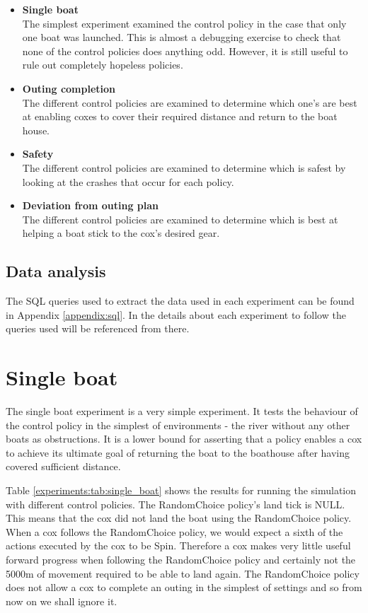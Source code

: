   \begin{itemize}
    \item{\textbf{Single boat}}\\
    The simplest experiment examined the control policy in the case
    that only one boat was launched. This is almost a debugging
    exercise to check that none of the control policies does anything
    odd. However, it is still useful to rule out completely hopeless policies.
  
    \item{\textbf{Outing completion}}\\
    The different control policies are examined to determine which
    one's are best at enabling coxes to cover their required distance
    and return to the boat house.
    
    \item{\textbf{Safety}}\\
    The different control policies are examined to determine which is
    safest by looking at the crashes that occur for each policy.

    \item{\textbf{Deviation from outing plan}}\\
    The different control policies are examined to determine which is
    best at helping a boat stick to the cox's desired gear.
  \end{itemize}

  \subsection{Data analysis}
  The SQL queries used to extract the data used in each experiment can be found in Appendix \ref{appendix:sql}. In the details about each experiment to follow the queries used will be referenced from there.

\section{Single boat}
  The single boat experiment is a very simple experiment. It tests the behaviour of the control policy in the simplest of environments - the river without any other boats as obstructions. It is a lower bound for asserting that a policy enables a cox to achieve its ultimate goal of returning the boat to the boathouse after having covered sufficient distance.
  
  Table \ref{experiments:tab:single_boat} shows the results for running the simulation with different control policies. The RandomChoice policy's land tick is NULL. This means that the cox did not land the boat using the RandomChoice policy. When a cox follows the RandomChoice policy, we would expect a sixth of the actions executed by the cox to be Spin. Therefore a cox makes very little useful forward progress when following the RandomChoice policy and certainly not the 5000m of movement required to be able to land again. The RandomChoice policy does not allow a cox to complete an outing in the simplest of settings and so from now on we shall ignore it.
  
